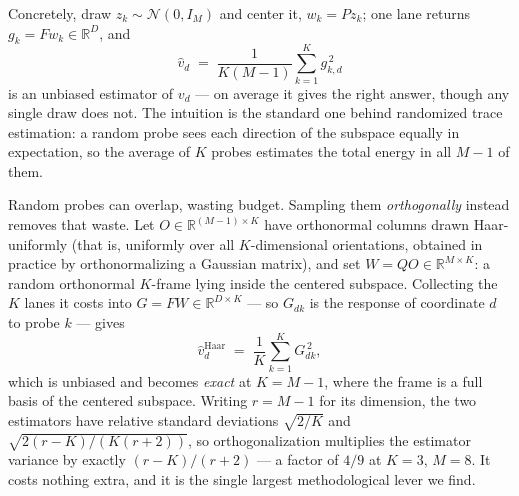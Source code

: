 \documentclass{article}
\begin{document}
Concretely, draw $z_k\sim\mathcal N(0,I_M)$ and center it, $w_k=Pz_k$; one lane returns
$g_k=Fw_k\in\mathbb{R}^{D}$, and
\begin{equation}
\widehat v_d \;=\; \frac{1}{K(M-1)}\sum_{k=1}^{K} g_{k,d}^{\,2}
\end{equation}
is an unbiased estimator of $v_d$ --- on average it gives the right answer, though any single draw
does not. The intuition is the standard one behind randomized trace estimation: a random probe sees
each direction of the subspace equally in expectation, so the average of $K$ probes estimates the
total energy in all $M-1$ of them.

Random probes can overlap, wasting budget. Sampling them \emph{orthogonally} instead removes that
waste. Let $O\in\mathbb{R}^{(M-1)\times K}$ have orthonormal columns drawn Haar-uniformly (that is,
uniformly over all $K$-dimensional orientations, obtained in practice by orthonormalizing a Gaussian
matrix), and set $W=QO\in\mathbb{R}^{M\times K}$: a random orthonormal $K$-frame lying inside the
centered subspace. Collecting the $K$ lanes it costs into
$G=FW\in\mathbb{R}^{D\times K}$ --- so $G_{dk}$ is the response of coordinate $d$ to probe $k$ ---
gives
\begin{equation}
\widehat v^{\mathrm{Haar}}_d \;=\; \frac{1}{K}\sum_{k=1}^{K} G_{dk}^{\,2},
\end{equation}
which is unbiased and becomes \emph{exact} at $K=M-1$, where the frame is a full basis of the
centered subspace. Writing $r=M-1$ for its dimension, the two estimators have relative standard
deviations $\sqrt{2/K}$ and $\sqrt{2(r-K)/(K(r+2))}$, so orthogonalization multiplies the estimator
variance by exactly $(r-K)/(r+2)$ --- a factor of $4/9$ at $K{=}3$, $M{=}8$. It costs nothing extra,
and it is the single largest methodological lever we find.
\end{document}
